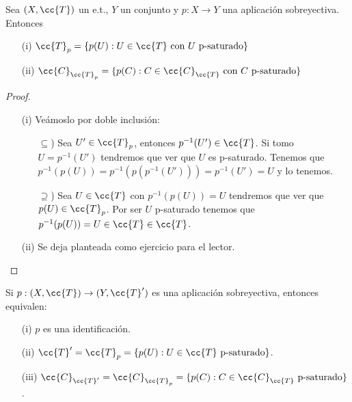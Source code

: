 \begin{prop}
    Sea $(X, \cc{T})$ un e.t., $Y$ un conjunto y $p:X\to Y$ una aplicación sobreyectiva. Entonces
    \begin{enumerate}
        \item[(i)] $\cc{T}_p=\{p(U):U\in \cc{T} \text{ con } U \text{ p-saturado}\}$
        \item[(ii)]  $\cc{C}_{\cc{T}_p}=\{p(C):C\in \cc{C}_{\cc{T}} \text{ con } C \text{ p-saturado}\}$
    \end{enumerate}
    \begin{proof}\
        \begin{itemize}
            \item[(i)] Veámoslo por doble inclusión:
            \begin{itemize}
                \item[$\subseteq$)] Sea $U'\in \cc{T}_p$, entonces $p^{-1}(U')\in \cc{T}$. Si tomo $U=p^{-1}(U')$ tendremos que ver que $U$ es p-saturado. Tenemos que $p^{-1}(p(U))=p^{-1}(p(p^{-1}(U')))=p^{-1}(U')=U$ y lo tenemos.
                \item[$\supseteq$)] Sea $U\in \cc{T}$ con $p^{-1}(p(U))=U$ tendremos que ver que $p(U)\in \cc{T}_p$. Por ser $U$ p-saturado tenemos que $p^{-1}(p(U))=U\in \cc{T}\in \cc{T}$.
            \end{itemize}
            \item[(ii)] Se deja planteada como ejercicio para el lector.
        \end{itemize}
    \end{proof}
\end{prop}

\begin{coro}
    Si $p:(X, \cc{T})\to (Y, \cc{T}')$ es una aplicación sobreyectiva, entonces equivalen:
    \begin{enumerate}
        \item[(i)] $p$ es una identificación.
        \item[(ii)] $\cc{T}'=\cc{T}_p=\{p(U):U\in \cc{T} \text{ p-saturado}\}$.
        \item[(iii)] $\cc{C}_{\cc{T}'}=\cc{C}_{\cc{T}_p}=\{p(C):C\in \cc{C}_{\cc{T}} \text{ p-saturado}\}$. 
    \end{enumerate}
    \endsquare
\end{coro}

